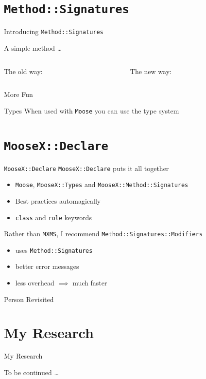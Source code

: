 \documentclass[mathserif]{beamer}
\providecommand{\code}[1]{{\texttt{\scriptsize{#1}}}}
\providecommand{\inputcode}[1]{
  \begin{block}{}
    \scriptsize{}
  \end{block}
}
\begin{document}
\section{\code{Method::Signatures}}

\begin{frame}{Introducing \texttt{Method::Signatures}}

A simple method \ldots

\vfill

\begin{columns}
  \begin{column}{0.49\linewidth}
    The old way:
    \inputcode{signatures/old}
  \end{column}
  \begin{column}{0.49\linewidth}
    The new way:
    \inputcode{signatures/new}
  \end{column}
\end{columns}
\end{frame}

\begin{frame}{More Fun}
  \inputcode{signatures/more}
\end{frame}

\begin{frame}{Types}
  When used with \code{Moose} you can use the type system
  \inputcode{signatures/types}
\end{frame}

\section{\code{MooseX::Declare}}

\begin{frame}{\texttt{MooseX::Declare}}
  \code{MooseX::Declare} puts it all together
  \begin{itemize}
    \item \code{Moose}, \code{MooseX::Types} and \code{MooseX::Method::Signatures}
    \item Best practices automagically
    \item \code{class} and \code{role} keywords
  \end{itemize}
  \vfill
  Rather than \code{MXMS}, I recommend \code{Method::Signatures::Modifiers}
    \begin{itemize}
      \item uses \code{Method::Signatures}
      \item better error messages
      \item less overhead $\implies$ much faster
    \end{itemize}
\end{frame}

\begin{frame}{Person Revisited}
  \inputcode{mxd/person}
\end{frame}

\section{My Research}

\begin{frame}{My Research}
  \begin{block}{}
    To be continued \ldots
  \end{block}
\end{frame}
\end{document}
